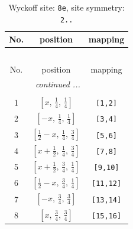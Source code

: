 \documentclass[fleqn,8pt]{jsarticle}
\begin{document}
\begin{longtable}{ccc}
\caption{Wyckoff site: {\tt 8e}, site symmetry: {\tt 2..}}
 \\
 \hline \hline
No. & position & mapping \\ \hline \endfirsthead

\multicolumn{2}{l}{\tablename\ \thetable{}} \\
 \hline \hline
No. & position & mapping \\ \hline \endhead

 \hline \hline
\multicolumn{2}{r}{\footnotesize\it continued ...} \\ \endfoot

 \hline \hline
\multicolumn{2}{r}{} \\ \endlastfoot

1 & $\left[ x,\, \frac{1}{4},\, \frac{1}{4} \right]$ & {\tt [1,2]} \\ \hline
2 & $\left[ - x,\, \frac{1}{4},\, \frac{1}{4} \right]$ & {\tt [3,4]} \\ \hline
3 & $\left[ \frac{1}{2} - x,\, \frac{1}{4},\, \frac{3}{4} \right]$ & {\tt [5,6]} \\ \hline
4 & $\left[ x + \frac{1}{2},\, \frac{1}{4},\, \frac{3}{4} \right]$ & {\tt [7,8]} \\ \hline
5 & $\left[ x + \frac{1}{2},\, \frac{3}{4},\, \frac{1}{4} \right]$ & {\tt [9,10]} \\ \hline
6 & $\left[ \frac{1}{2} - x,\, \frac{3}{4},\, \frac{1}{4} \right]$ & {\tt [11,12]} \\ \hline
7 & $\left[ - x,\, \frac{3}{4},\, \frac{3}{4} \right]$ & {\tt [13,14]} \\ \hline
8 & $\left[ x,\, \frac{3}{4},\, \frac{3}{4} \right]$ & {\tt [15,16]} \\
\end{longtable}
\renewcommand{\arraystretch}{1.2}
\end{document}
